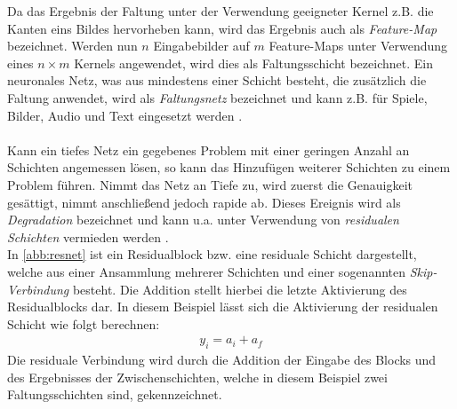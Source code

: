\documentclass[12pt,a4paper,bibliography=totocnumbered,listof=totocnumbered]{article}
\begin{document}
Da das Ergebnis der Faltung unter der Verwendung geeigneter Kernel z.B. die Kanten eins Bildes hervorheben kann, wird das Ergebnis auch als \emph{Feature-Map} bezeichnet. Werden nun $n$ Eingabebilder auf $m$ Feature-Maps unter Verwendung eines $n \times m$ Kernels angewendet, wird dies als Faltungsschicht bezeichnet. Ein neuronales Netz, was aus mindestens einer Schicht besteht, die zusätzlich die Faltung anwendet, wird als \emph{Faltungsnetz} bezeichnet und kann z.B. für Spiele, Bilder, Audio und Text eingesetzt werden \citep[Kapitel 6.4]{Ferguson.2019}.\\\\
Kann ein tiefes Netz ein gegebenes Problem mit einer geringen Anzahl an Schichten angemessen lösen, so kann das Hinzufügen weiterer Schichten zu einem Problem führen. Nimmt das Netz an Tiefe zu, wird zuerst die Genauigkeit gesättigt, nimmt anschließend jedoch rapide ab. Dieses Ereignis wird als \emph{Degradation} bezeichnet und kann u.a. unter Verwendung von \emph{residualen Schichten} vermieden werden \citep{He.2015}.\\
In \autoref{abb:resnet} ist ein Residualblock bzw. eine residuale Schicht dargestellt, welche aus einer Ansammlung mehrerer Schichten und einer sogenannten \emph{Skip-Verbindung} besteht. Die Addition stellt hierbei die letzte Aktivierung des Residualblocks dar. In diesem Beispiel lässt sich die Aktivierung der residualen Schicht wie folgt berechnen:
\begin{align}
y_i=a_i+a_f
\label{eq:resnet}
\end{align} 
Die residuale Verbindung wird durch die Addition der Eingabe des Blocks und des Ergebnisses der Zwischenschichten, welche in diesem Beispiel zwei Faltungsschichten sind, gekennzeichnet.
\end{document}

